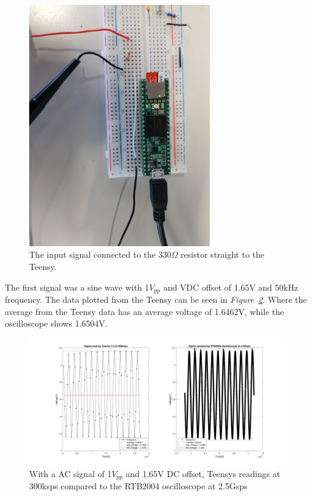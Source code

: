 \begin{figure}[h]
    \centering
    \includegraphics[width=0.7\textwidth]{graphics/Last2Tests.jpg}
    \caption{The input signal connected to the 330$\Omega$ resistor straight to the Teensy.}
    \label{fig:Last2TestsSetup}
\end{figure}



The first signal was a sine wave with 1$V_{pp}$ and VDC offset of 1.65V and 50kHz frequency.
The data plotted from the Teensy can be seen in \textit{Figure~\ref{fig:OscilloCompTeensyAC}}.
Where the average from the Teensy data has an average voltage of 1.6462V, while the oscilloscope shows 1.6504V.


\clearpage


\begin{figure}[h]
    \centering
    \includegraphics[width=1.0\textwidth]{graphics/OscilloTeensyAC50k1vpp165voffpng.png}
    \caption{With a AC signal of 1$V_{pp}$ and 1.65V DC offset, Teensys readings at 300ksps compared to the RTB2004 oscilloscope at 2.5Gsps}
    \label{fig:OscilloCompTeensyAC}
\end{figure}

